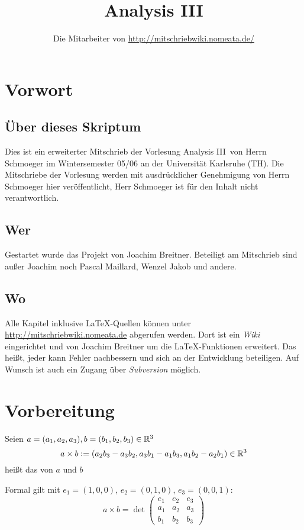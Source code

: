 \documentclass[a4paper,twoside,DIV15,BCOR12mm]{scrbook}
\author{Die Mitarbeiter von \url{http://mitschriebwiki.nomeata.de/}}
\title{Analysis III}
\begin{document}
\maketitle
 
\renewcommand{\thechapter}{\Roman{chapter}}
\tableofcontents

\chapter{Vorwort}

\section{Über dieses Skriptum}
Dies ist ein erweiterter Mitschrieb der Vorlesung \glqq Analysis III\grqq\ von Herrn Schmoeger im
Wintersemester 05/06 an der Universität Karlsruhe (TH). Die Mitschriebe der Vorlesung werden mit
ausdrücklicher Genehmigung von Herrn Schmoeger hier veröffentlicht, Herr Schmoeger ist für den
Inhalt nicht verantwortlich.

\section{Wer}
Gestartet wurde das Projekt von Joachim Breitner. Beteiligt am Mitschrieb sind außer Joachim
noch Pascal Maillard, Wenzel Jakob und andere.

\section{Wo}
Alle Kapitel inklusive \LaTeX-Quellen können unter \url{http://mitschriebwiki.nomeata.de} abgerufen werden.
Dort ist ein \emph{Wiki} eingerichtet und von Joachim Breitner um die \LaTeX-Funktionen erweitert.
Das heißt, jeder kann Fehler nachbessern und sich an der Entwicklung
beteiligen. Auf Wunsch ist auch ein Zugang über \emph{Subversion} möglich.

\chapter{Vorbereitung}

\begin{definition}
Seien $a=(a_1,a_2,a_3), b=(b_1,b_2,b_3) \in \mathbb{R}^3$
\[ a\times b := (a_2b_3 - a_3b_2, a_3b_1 - a_1b_3, a_1b_2-a_2b_1) \in \mathbb{R}^3 \]
heißt das  von $a$ und $b$

Formal gilt mit $e_1=(1,0,0)$, $e_2=(0,1,0)$, $e_3=(0,0,1)$:
\[ a\times b = \det \begin{pmatrix} e_1 & e_2 & e_3 \\ a_1 & a_2 & a_3 \\ b_1 & b_2 & b_3 \end{pmatrix} \]
\end{definition}
\end{document}
